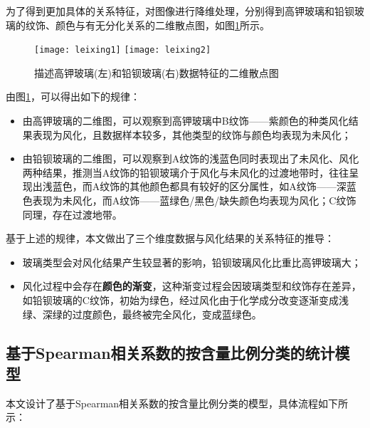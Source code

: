 \documentclass[withoutpreface,bwprint]{cumcmthesis} %
\begin{document}
为了得到更加具体的关系特征，对图像进行降维处理，分别得到高钾玻璃和铅钡玻璃的纹饰、颜色与有无分化关系的二维散点图，如图\ref{leixing}所示。

\begin{figure}[!h]
	\centering
	\texttt{[image: leixing1]}
	\texttt{[image: leixing2]}
	\caption{描述高钾玻璃(左)和铅钡玻璃(右)数据特征的二维散点图}
	\label{leixing}
\end{figure}


由图\ref{leixing}，可以得出如下的规律：
\begin{itemize}
	\item 由高钾玻璃的二维图，可以观察到高钾玻璃中B纹饰——紫颜色的种类风化结果表现为风化，且数据样本较多，其他类型的纹饰与颜色均表现为未风化；
	\item 由铅钡玻璃的二维图，可以观察到A纹饰的浅蓝色同时表现出了未风化、风化两种结果，推测当A纹饰的铅钡玻璃介于风化与未风化的过渡地带时，往往呈现出浅蓝色，而A纹饰的其他颜色都具有较好的区分属性，如A纹饰——深蓝色表现为未风化，而A纹饰——蓝绿色/黑色/缺失颜色均表现为风化；C纹饰同理，存在过渡地带。
\end{itemize}


基于上述的规律，本文做出了三个维度数据与风化结果的关系特征的推导：
\begin{itemize}
	\item 玻璃类型会对风化结果产生较显著的影响，铅钡玻璃风化比重比高钾玻璃大；
	\item 风化过程中会存在\textbf{颜色的渐变}，这种渐变过程会因玻璃类型和纹饰存在差异，如铅钡玻璃的C纹饰，初始为绿色，经过风化由于化学成分改变逐渐变成浅绿、深绿的过度颜色，最终被完全风化，变成蓝绿色。
\end{itemize}


\subsection{基于Spearman相关系数的按含量比例分类的统计模型}

本文设计了基于Spearman相关系数的按含量比例分类的模型，具体流程如下所示：
\end{document}
